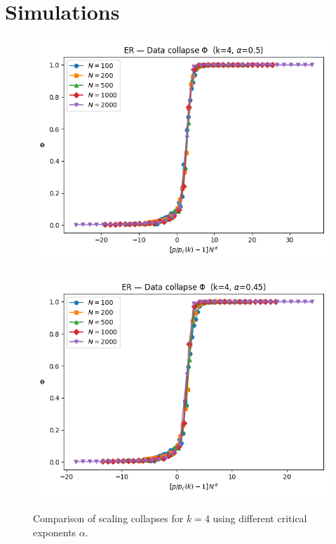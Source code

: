 \section{Simulations}

\begin{figure}[h!]
    \centering
    \setlength{\tabcolsep}{2pt}
    \begin{minipage}[t]{0.48\textwidth}
        \centering
        \includegraphics[width=\textwidth]{images/IMAGES TASK2/ER_collapse_phi_k4_alpha0.5.png}
        \label{fig:collapse_alpha045}
    \end{minipage}
    \hfill
    \begin{minipage}[t]{0.48\textwidth}
        \centering
        \includegraphics[width=\textwidth]{images/IMAGES TASK2/ER_collapse_phi_k4_alpha0.45.png}
        \label{fig:collapse_alpha050}
    \end{minipage}
    \caption{Comparison of scaling collapses for $k=4$ using different critical exponents $\alpha$.}
    \label{fig:collapse_k4}
\end{figure}

